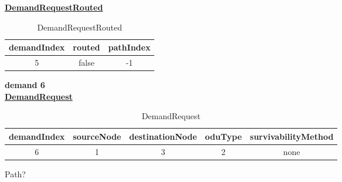 \underline{\textbf{DemandRequestRouted}}

\begin{table}[H]
	\centering
	\begin{tabular}{| c | c | c |}
		\hline
		\textbf{demandIndex} & \textbf{routed}  & \textbf{pathIndex}\\ \hline
		5                    & false            & -1                 \\ \hline
	\end{tabular}
	\caption{DemandRequestRouted}
	\label{demand_request_routed}
\end{table}

\textbf{demand 6}\\

\underline{\textbf{DemandRequest}}

\begin{table}[H]
	\centering
	\begin{tabular}{| c | c | c | c | c |}
		\hline
		\textbf{demandIndex} & \textbf{sourceNode} & \textbf{destinationNode} & \textbf{oduType} & \textbf{survivabilityMethod}\\ \hline
		6                    & 1                   & 3                        & 2                & none						   \\ \hline
	\end{tabular}
	\caption{DemandRequest}
	\label{demand_request}
\end{table}

Path?\\

\begin{table}[H]
	\centering
	\caption{paths}
	\label{paths}
\end{table}

